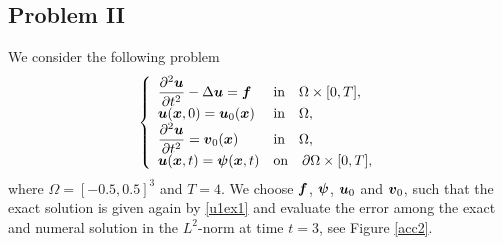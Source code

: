 \documentclass[english,a4paper]{article}
\newcommand{\psibf}{\text{\mbox{\boldmath $\psi$}}}
\newcommand{\ubf}{\text{\mbox{\boldmath $u$}}}
\newcommand{\vbf}{\text{\mbox{\boldmath $v$}}}
\newcommand{\xbf}{\text{\mbox{\boldmath $x$}}}
\newcommand{\fbf}{\text{\mbox{\boldmath $f$}}}
\begin{document}
\subsection{Problem II} 
We consider the following problem
\begin{equation}\label{ex2}
\left\{
\begin{array}{ll}
\displaystyle\frac{\partial^2 \ubf}{\partial t^2} -\Delta \ubf = \fbf & \text{in}\quad
\Omega\times [0,T],\\
\displaystyle\ubf(\xbf, 0) =  \ubf_0(\xbf)  & \text{in}\quad \Omega,\\
\displaystyle\frac{\partial^2 \ubf}{\partial t^2} =  \vbf_0(\xbf)  & \text{in}\quad \Omega,\\
\displaystyle\ubf(\xbf, t) = \psibf(\xbf, t)   & \text{on}\quad \partial\Omega\times[0,T],
\end{array}
\right.
\end{equation}
where $\Omega=[-0.5, 0.5]^3$ and $T=4$.
We choose $\fbf$, $\psibf$, $\ubf_0$ and $\vbf_0$, such that the exact solution
is given again by \eqref{u1ex1} and  evaluate the error
among the exact  and numeral solution in the $L^2$-norm  at
 time $t=3$, see Figure \ref{acc2}.
\end{document}
